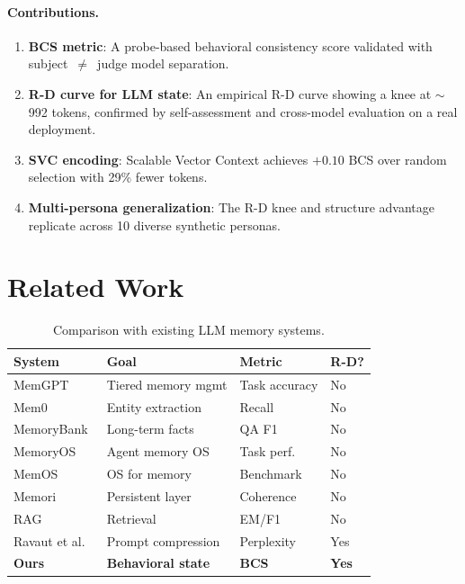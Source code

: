 \documentclass[10pt,twocolumn]{article}
\begin{document}
\paragraph{Contributions.}
\begin{enumerate}[noitemsep,topsep=2pt]
  \item \textbf{BCS metric}: A probe-based behavioral consistency score
    validated with subject~$\neq$~judge model separation.
  \item \textbf{R-D curve for LLM state}: An empirical R-D curve showing
    a knee at $\sim$992 tokens, confirmed by self-assessment and
    cross-model evaluation on a real deployment.
  \item \textbf{SVC encoding}: Scalable Vector Context achieves
    $+0.10$ BCS over random selection with 29\% fewer tokens.
  \item \textbf{Multi-persona generalization}: The R-D knee and
    structure advantage replicate across 10 diverse synthetic personas.
\end{enumerate}

\section{Related Work}
\label{sec:related}

\begin{table}[h]
\centering
\caption{Comparison with existing LLM memory systems.}
\label{tab:related}
\small
\begin{tabular}{@{}llll@{}}
\toprule
System & Goal & Metric & R-D? \\
\midrule
MemGPT~\cite{packer2023} & Tiered memory mgmt & Task accuracy & No \\
Mem0~\cite{mem0_2025} & Entity extraction & Recall & No \\
MemoryBank~\cite{zhong2023} & Long-term facts & QA F1 & No \\
MemoryOS~\cite{kang2025} & Agent memory OS & Task perf. & No \\
MemOS~\cite{liu2025} & OS for memory & Benchmark & No \\
Memori~\cite{memori2026} & Persistent layer & Coherence & No \\
RAG~\cite{lewis2020} & Retrieval & EM/F1 & No \\
Ravaut et al.~\cite{ravaut2024} & Prompt compression & Perplexity & Yes \\
\textbf{Ours} & \textbf{Behavioral state} & \textbf{BCS} & \textbf{Yes} \\
\bottomrule
\end{tabular}
\end{table}
\end{document}
